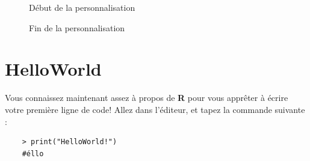 \documentclass[10.5pt,a4paper]{article}
\begin{document}
\begin{figure}[H]
  \centering
  \caption{Début de la personnalisation}
  \label{rstudio2}
\end{figure}

\begin{figure}[H]
  \centering
  \caption{Fin de la personnalisation}
  \label{rstudio3}
\end{figure}

\section{HelloWorld}

Vous connaissez maintenant assez à propos de \textbf{R} pour vous apprêter à écrire votre première ligne de code! Allez dans l'éditeur, et tapez la commande suivante :
    \begin{lstlisting}
    > print("HelloWorld!")
    #éllo
    \end{lstlisting}
   
\end{document}

